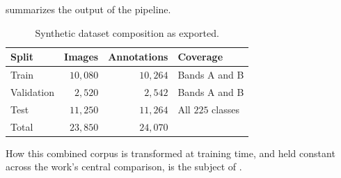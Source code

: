  summarizes the output of the pipeline.

\begin{table}[htbp]
\centering
\caption{Synthetic dataset composition as exported.}
\label{tab:synthetic-composition}
\begin{tabular}{@{}lrrl@{}}
\toprule
Split & Images & Annotations & Coverage \\
\midrule
Train & $10{,}080$ & $10{,}264$ & Bands A and B \\
Validation & $2{,}520$ & $2{,}542$ & Bands A and B \\
Test & $11{,}250$ & $11{,}264$ & All $225$ classes \\
\midrule
Total & $23{,}850$ & $24{,}070$ & \\
\bottomrule
\end{tabular}
\end{table}

How this combined corpus is transformed at training time, and held constant across the work's central comparison, is the subject of .
